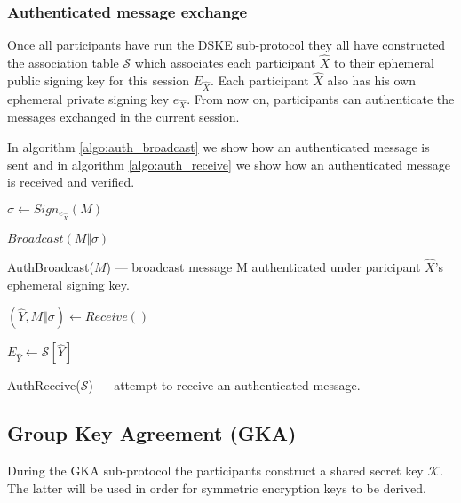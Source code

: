 \clearpage

\subsubsection{Authenticated message exchange}
Once all participants have run the DSKE sub-protocol they all have constructed the association table $\mathcal{S}$ which associates each participant $\hat{X}$ to their ephemeral public signing key for this session $E_{\hat{X}}$. Each participant $\hat{X}$ also has his own ephemeral private signing key $e_{\hat{X}}$. From now on, participants can authenticate the messages exchanged in the current session.

In algorithm \ref{algo:auth_broadcast} we show how an authenticated message is sent and in algorithm \ref{algo:auth_receive} we show how an authenticated message is received and verified.

\begin{algorithm}[H]
  \Begin
  {		
	$\sigma \leftarrow Sign_{e_{\hat{X}}}(M)$
	
	$Broadcast(M \Vert \sigma)$
  }
  \caption{AuthBroadcast($M$) --- broadcast message M authenticated under paricipant $\hat{X}$'s ephemeral signing key.}
  \label{algo:auth_broadcast}
\end{algorithm}

\begin{algorithm}[H]
  \Begin
  {	
    $(\hat{Y}, M \Vert \sigma) \leftarrow Receive()$  
  
    $E_{\hat{Y}} \leftarrow \mathcal{S}[\hat{Y}]$
  
    {
    }  
  
  }
  \caption{AuthReceive($\mathcal{S}$) --- attempt to receive an authenticated message.}
  \label{algo:auth_receive}
\end{algorithm}

\subsection{Group Key Agreement (GKA)}
\label{subsections:gka}

During the GKA sub-protocol the participants construct a shared secret key $\mathcal{K}$. The latter will be used in order for symmetric encryption keys to be derived.

